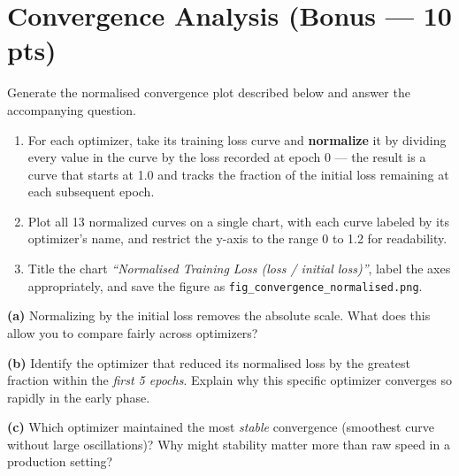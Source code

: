 \documentclass[12pt,a4paper]{article}
\begin{document}
\section{Convergence Analysis (Bonus — 10 pts)}

Generate the normalised convergence plot described below and answer the accompanying
question.

\begin{stepbox}
\begin{enumerate}[leftmargin=*, label=\arabic*.]
  \item For each optimizer, take its training loss curve and \textbf{normalize} it by
        dividing every value in the curve by the loss recorded at epoch 0 — the result
        is a curve that starts at 1.0 and tracks the fraction of the initial loss
        remaining at each subsequent epoch.
  \item Plot all 13 normalized curves on a single chart, with each curve labeled by its
        optimizer's name, and restrict the y-axis to the range 0 to 1.2 for readability.
  \item Title the chart \emph{``Normalised Training Loss (loss / initial loss)''},
        label the axes appropriately, and save the figure as
        \texttt{fig\_convergence\_normalised.png}.
\end{enumerate}
\end{stepbox}

\begin{tcolorbox}[colback=lightblue!40, colframe=headerblue,
  title={\textbf{Bonus Question — Normalised Convergence}},
  fonttitle=\normalsize\bfseries, breakable]

\textbf{(a)} Normalizing by the initial loss removes the absolute scale.
What does this allow you to compare fairly across optimizers?

\textbf{(b)} Identify the optimizer that reduced its normalised loss by the
greatest fraction within the \emph{first 5 epochs}. Explain why this specific
optimizer converges so rapidly in the early phase.

\textbf{(c)} Which optimizer maintained the most \emph{stable} convergence
(smoothest curve without large oscillations)? Why might stability matter more
than raw speed in a production setting?
\end{tcolorbox}
\end{document}
